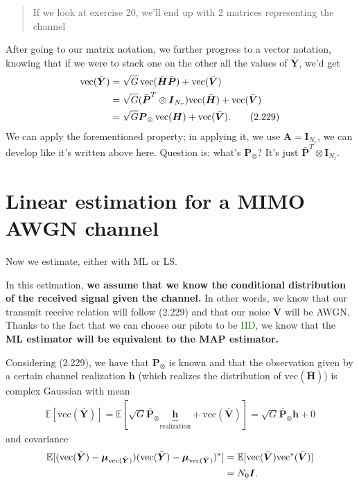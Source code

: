 \documentclass[a4paper, 12pt]{book}
\begin{document}
\begin{quote}
    \color{green}\vline\hspace{0.5em}\color{black} If we look at exercise 20, we'll end up with 2 matrices representing the channel
\end{quote}

After going to our matrix notation, we further progress to a vector notation, knowing that if we were to stack one on the other all the values of $\bar{\boldsymbol{Y}}$, we'd get
\begin{align}
\text{vec}(\bar{\boldsymbol{Y}}) &= \sqrt{G} \, \text{vec}(\bar{\boldsymbol{H}}\bar{\boldsymbol{P}}) + \text{vec}(\bar{\boldsymbol{V}}) \notag \\
&= \sqrt{G}(\bar{\boldsymbol{P}}^T \otimes \boldsymbol{I}_{N_r})\text{vec}(\bar{\boldsymbol{H}}) + \text{vec}(\bar{\boldsymbol{V}}) \notag \\
&= \sqrt{G}\boldsymbol{P}_{\otimes} \, \text{vec}(\boldsymbol{H}) + \text{vec}(\bar{\boldsymbol{V}}). \tag{2.229}
\end{align}
We can apply the forementioned property; in applying it, we use $\boldsymbol{A} = \boldsymbol{I}_{N_r}$, we can develop like it's written above here.
Question is: what's $\boldsymbol{P}_{\otimes}$? It's just $\bar{\boldsymbol{P}}^T \otimes \boldsymbol{I}_{N_t}$.

\section{Linear estimation for a MIMO AWGN channel}

Now we estimate, either with ML or LS.

In this estimation, \textbf{we assume that we know the conditional distribution of the received signal given the channel.} In other words, we know that our transmit receive relation will follow (2.229) and that our noise $\bar{\boldsymbol{V}}$ will be AWGN.
Thanks to the fact that we can choose our pilots to be \textcolor{green}{IID}, we know that the \textbf{ML estimator will be equivalent to the MAP estimator.}

Considering (2.229), we have that $\boldsymbol{P}_{\otimes}$ is known and that the observation given by a certain channel realization $\mathbf{h}$ (which realizes the distribution of $\text{vec}(\bar{\boldsymbol{H}})$) is complex Gaussian with mean
\begin{align}
\mathbb{E}[\text{vec}(\bar{\boldsymbol{Y}})] = \mathbb{E}[\sqrt{G}\bar{\boldsymbol{P}}_{\otimes}\underbrace{\mathbf{h}}_{\text{realization}} + \text{vec}(\bar{\boldsymbol{V}})] = \sqrt{G}\bar{\boldsymbol{P}}_{\otimes}\mathbf{h} + 0
\end{align}
and covariance
\begin{align}
\mathbb{E}[(\text{vec}(\bar{\boldsymbol{Y}}) - \boldsymbol{\mu}_{\text{vec}(\bar{\boldsymbol{Y}})})(\text{vec}(\bar{\boldsymbol{Y}}) - \boldsymbol{\mu}_{\text{vec}(\bar{\boldsymbol{Y}})})^*] &= \mathbb{E}[\text{vec}(\bar{\boldsymbol{V}})\text{vec}^*(\bar{\boldsymbol{V}})] \notag \\
&= N_0 \boldsymbol{I}.
\end{align}
\end{document}
